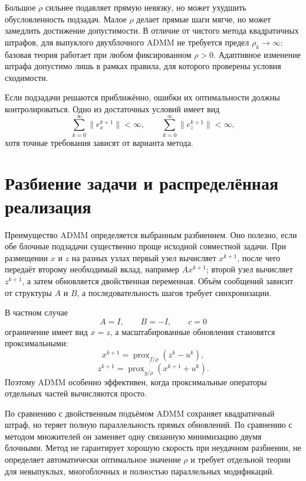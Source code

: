 Большое \(\rho\) сильнее подавляет прямую невязку, но может ухудшить
обусловленность подзадач. Малое \(\rho\) делает прямые шаги мягче, но
может замедлить достижение допустимости. В отличие от чистого метода
квадратичных штрафов, для выпуклого двухблочного ADMM не требуется
предел \(\rho_k\to\infty\): базовая теория работает при любом
фиксированном \(\rho>0\). Адаптивное изменение штрафа допустимо лишь
в рамках правила, для которого проверены условия сходимости.

Если подзадачи решаются приближённо, ошибки их оптимальности должны
контролироваться. Одно из достаточных условий имеет вид
\[
    \sum_{k=0}^{\infty}\lVert e_x^{k+1}\rVert<\infty,
    \qquad
    \sum_{k=0}^{\infty}\lVert e_z^{k+1}\rVert<\infty,
\]
хотя точные требования зависят от варианта метода.

\section{Разбиение задачи и распределённая реализация}

Преимущество ADMM определяется выбранным разбиением. Оно полезно,
если обе блочные подзадачи существенно проще исходной совместной
задачи. При размещении \(x\) и \(z\) на разных узлах первый узел
вычисляет \(x^{k+1}\), после чего передаёт второму необходимый вклад,
например \(Ax^{k+1}\); второй узел вычисляет \(z^{k+1}\), а затем
обновляется двойственная переменная. Объём сообщений зависит от
структуры \(A\) и \(B\), а последовательность шагов требует
синхронизации.

В частном случае
\[
    A=I,
    \qquad
    B=-I,
    \qquad
    c=0
\]
ограничение имеет вид \(x=z\), а масштабированные обновления
становятся проксимальными:
\[
    x^{k+1}
    =
    \operatorname{prox}_{f/\rho}(z^k-u^k),
\]
\[
    z^{k+1}
    =
    \operatorname{prox}_{g/\rho}(x^{k+1}+u^k).
\]
Поэтому ADMM особенно эффективен, когда проксимальные операторы
отдельных частей вычисляются просто.

По сравнению с двойственным подъёмом ADMM сохраняет квадратичный
штраф, но теряет полную параллельность прямых обновлений. По сравнению
с методом множителей он заменяет одну связанную минимизацию двумя
блочными. Метод не гарантирует хорошую скорость при неудачном
разбиении, не определяет автоматически оптимальное значение \(\rho\)
и требует отдельной теории для невыпуклых, многоблочных и полностью
параллельных модификаций.
